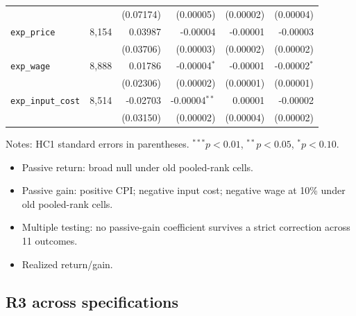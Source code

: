 \documentclass[11pt,letterpaper,english,final]{article}
\begin{document}
\begin{table}[H]
{\begin{tabular}{lrrrrr}
                            &          & (0.07174) & (0.00005) & (0.00002) & (0.00004) \\
\texttt{exp\_price}       & 8{,}154  &  0.03987 & -0.00004 & -0.00001 & -0.00003 \\
                            &          & (0.03706) & (0.00003) & (0.00002) & (0.00002) \\
\texttt{exp\_wage}        & 8{,}888  &  0.01786 & -0.00004$^{*}$ & -0.00001 & -0.00002$^{*}$ \\
                            &          & (0.02306) & (0.00002) & (0.00001) & (0.00001) \\
\texttt{exp\_input\_cost}& 8{,}514  & -0.02703 & -0.00004$^{**}$ &  0.00001 & -0.00002 \\
                            &          & (0.03150) & (0.00002) & (0.00004) & (0.00002) \\
\bottomrule
\end{tabular}}
\begin{flushleft}
\scriptsize Notes: HC1 standard errors in parentheses. $^{***}p<0.01$, $^{**}p<0.05$, $^{*}p<0.10$.
\end{flushleft}
\end{table}

\begin{itemize}
\item Passive return: broad null under old pooled-rank cells.
\item Passive gain: positive CPI; negative input cost; negative wage at 10\% under old pooled-rank cells.
\item Multiple testing: no passive-gain coefficient survives a strict correction across 11 outcomes.
\item Realized return/gain.
\end{itemize}

\subsection{R3 across specifications}
\end{document}
